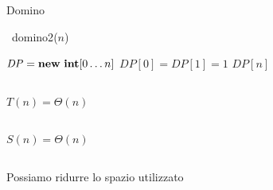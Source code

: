 \begin{frame}[fragile]{Domino}

\begin{Procedure}
\caption[A]{\INTEGER\  \textsf{domino2}(\INTEGER $n$)}
  $\mathit{DP} = \NEW\ \INTEGER[0 \ldots n]$\;
  $\mathit{DP}[0] = \mathit{DP}[1] = 1$\;
  \Return $\mathit{DP}[n]$\;
\end{Procedure}

\begin{columns}[T]
\pause
{}
\bigskip
\alert{$T(n) = \Theta(n)$}
\end{columns}

\begin{columns}[T]
\pause
{}
\bigskip
\alert{$S(n) = \Theta(n)$}
\end{columns}

\begin{columns}[T]
\pause
{}
\bigskip
\alert{Possiamo ridurre lo spazio utilizzato}
\end{columns}

\end{frame}

